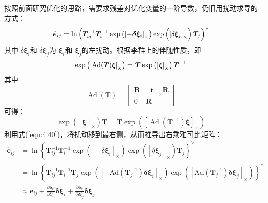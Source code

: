 按照前面研究优化的思路，需要求残差对优化变量的一阶导数，仍旧用扰动求导的方式：
\begin{equation}
\label{eqn:4.38}
\setlength{\abovedisplayskip}{6pt}
\setlength{\belowdisplayskip}{6pt}
\hat{\boldsymbol{e}}_{i j}=
\ln \left(\boldsymbol{T}_{i j}^{-1} \boldsymbol{T}_{i}^{-1} \exp \left(\left[-\boldsymbol{\delta} \boldsymbol{\xi}_{i}\right]_\times\right) 
\exp \left(\left[\delta \boldsymbol{\xi}_{j}\right]_\times\right) \boldsymbol{T}_{j}\right)^{\vee}
\end{equation}
其中 $\delta \bm{\xi}_{i} $和 $\delta \bm{\xi}_{j} $为 $\bm{\xi}_{i}  $和 $\bm{\xi}_{j}  $的左扰动。根据李群上的伴随性质，即
\begin{equation}
\label{eqn:4.39}
\setlength{\abovedisplayskip}{6pt}
\setlength{\belowdisplayskip}{6pt}
\exp \left(\left[\operatorname{Ad}(\boldsymbol{T}) \boldsymbol{\xi}\right]_\times\right)=
\boldsymbol{T} \exp \left( \left[\boldsymbol{\xi}\right]_\times\right) \boldsymbol{T}^{-1}
\end{equation}
其中
\[\operatorname{Ad}(\boldsymbol{T})=\left[ \begin{array}{cc}{\boldsymbol{R}} & {\left[\boldsymbol{t}\right]_\times \boldsymbol{R}} \\ {0} & {\boldsymbol{R}}\end{array}\right]\]
可得：
\begin{equation}
\label{eqn:4.40}
\exp \left( \left[\boldsymbol{\xi}\right]_\times\right) \boldsymbol{T}=
\boldsymbol{T} \exp \left(\left[\operatorname{Ad}\left(\boldsymbol{T}^{-1}\right) \boldsymbol{\xi}\right]_\times\right)
\end{equation}
利用式(\ref{eqn:4.40})，将扰动移到最右侧，从而推导出右乘雅可比矩阵：
\begin{equation}
\label{eqn:4.41}
\begin{aligned} 
\hat{\bm{e}}_{i j} &=
\ln \left\{
\boldsymbol{T}_{i j}^{-1} \boldsymbol{T}_{i}^{-1} 
\exp \left( \left[-\delta \boldsymbol{\xi}_{i}\right]_\times \right) 
\exp \left( \left[\delta \boldsymbol{\xi}_{j}\right]_\times \right) \boldsymbol{T}_{j}
\right\}^{\vee} \\
&=
\ln \left\{
\boldsymbol{T}_{i j}^{-1} \boldsymbol{T}_{i}^{-1} \boldsymbol{T}_{j} 
\exp \left(
\left[-\mathrm{Ad}\left(\boldsymbol{T}_{j}^{-1}\right) \boldsymbol{\delta} \boldsymbol{\xi}_{i}\right]_\times
\right) 
\exp \left(
\left[\mathrm{A} \mathrm{d}\left(\boldsymbol{T}_{j}^{-1}\right) \boldsymbol{\delta} \boldsymbol{\xi}_{j}\right]_\times
\right)
\right\} ^ {\vee}\\
& \approx \boldsymbol{e}_{i j} + \frac{\partial \boldsymbol{e}_{i j}}{\partial \delta \xi_{i}} \boldsymbol{\delta} \boldsymbol{\xi}_{i} 
+ \frac{\partial \boldsymbol{e}_{i j}}{\partial \delta \xi_{j}} \boldsymbol{\delta} \boldsymbol{\xi}_{j}
\end{aligned}
\end{equation}
